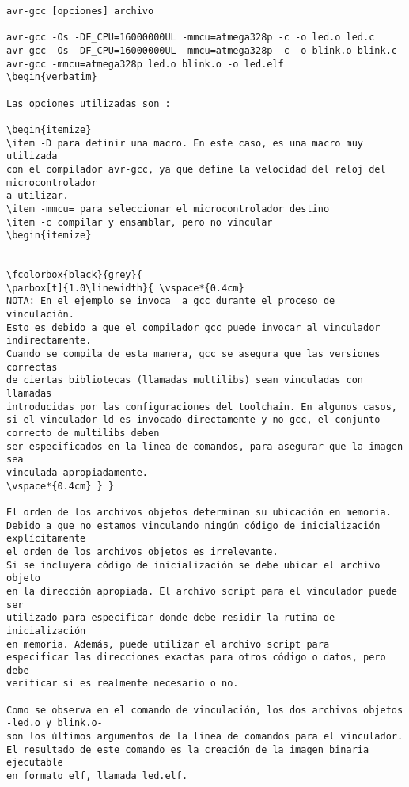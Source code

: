 \documentclass[12pt]{article}
\begin{document}
\begin{verbatim}
avr-gcc [opciones] archivo

avr-gcc -Os -DF_CPU=16000000UL -mmcu=atmega328p -c -o led.o led.c
avr-gcc -Os -DF_CPU=16000000UL -mmcu=atmega328p -c -o blink.o blink.c
avr-gcc -mmcu=atmega328p led.o blink.o -o led.elf
\begin{verbatim}

Las opciones utilizadas son :

\begin{itemize}
\item -D para definir una macro. En este caso, es una macro muy utilizada
con el compilador avr-gcc, ya que define la velocidad del reloj del microcontrolador
a utilizar.
\item -mmcu= para seleccionar el microcontrolador destino 
\item -c compilar y ensamblar, pero no vincular
\begin{itemize}


\fcolorbox{black}{grey}{
\parbox[t]{1.0\linewidth}{ \vspace*{0.4cm}
NOTA: En el ejemplo se invoca  a gcc durante el proceso de vinculación.
Esto es debido a que el compilador gcc puede invocar al vinculador indirectamente.
Cuando se compila de esta manera, gcc se asegura que las versiones correctas
de ciertas bibliotecas (llamadas multilibs) sean vinculadas con llamadas
introducidas por las configuraciones del toolchain. En algunos casos, si el vinculador ld es invocado directamente y no gcc, el conjunto correcto de multilibs deben
ser especificados en la linea de comandos, para asegurar que la imagen sea
vinculada apropiadamente.
\vspace*{0.4cm} } }

El orden de los archivos objetos determinan su ubicación en memoria.
Debido a que no estamos vinculando ningún código de inicialización explícitamente
el orden de los archivos objetos es irrelevante.
Si se incluyera código de inicialización se debe ubicar el archivo objeto 
en la dirección apropiada. El archivo script para el vinculador puede ser 
utilizado para especificar donde debe residir la rutina de inicialización
en memoria. Además, puede utilizar el archivo script para 
especificar las direcciones exactas para otros código o datos, pero debe
verificar si es realmente necesario o no.

Como se observa en el comando de vinculación, los dos archivos objetos -led.o y blink.o-
son los últimos argumentos de la linea de comandos para el vinculador.
El resultado de este comando es la creación de la imagen binaria ejecutable
en formato elf, llamada led.elf.


\end{verbatim}
\end{document}
